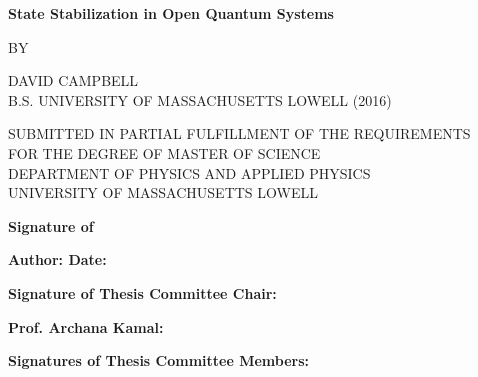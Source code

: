 \documentclass[12pt, oneside]{extarticle}   	%
\begin{document}
\begin{titlepage}
\begin{center}
\par
\vspace*{0.5in}
{\bf \Large State Stabilization in Open Quantum Systems}
\par


\vspace{0.5in}
\footnotesize{\normalsize BY}
\par
\vspace{0.35in}
\uppercase{\normalsize David Campbell}\\

\uppercase{\normalsize B.S. University of Massachusetts Lowell (2016)}
\par
\vspace{0.35in}
{\normalsize SUBMITTED IN PARTIAL FULFILLMENT OF THE REQUIREMENTS}\\
{\normalsize FOR THE DEGREE OF MASTER OF SCIENCE}\\
{\normalsize DEPARTMENT OF PHYSICS AND APPLIED PHYSICS}\\
{\normalsize UNIVERSITY OF MASSACHUSETTS LOWELL}
\end{center}
\par
\vspace*{\fill}
{\bf Signature of}
\par
\vspace{0.05in}
{\bf Author: \underline{\hspace{2.94 in}} Date: \underline{\hspace{1.1in}}}
\par

\vspace{0.15in}
{\bf Signature of Thesis Committee Chair: }
\par
\vspace{0.2in}
\newlength{\lengthak}
{\bf Prof. Archana Kamal: \underline{\hspace{\lengthak}}}
\par

\vspace{0.2in}
{\bf Signatures of Thesis Committee Members:}
\par


\end{titlepage}
\end{document}
